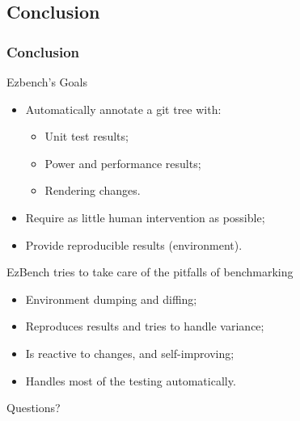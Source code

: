 \documentclass[11pt,english,compress]{beamer}
\begin{document}
\subsection*{Conclusion}
\begin{frame}
	\frametitle{Conclusion}
	
	\begin{block}{Ezbench's Goals}
		\begin{itemize}
			\item Automatically annotate a git tree with:
			\begin{itemize}
				\item Unit test results;
				\item Power and performance results;
				\item Rendering changes.
			\end{itemize}
			\item Require as little human intervention as possible;
			\item Provide reproducible results (environment).
		\end{itemize}
	\end{block}
	
	\pause
	
	\begin{block}{EzBench tries to take care of the pitfalls of benchmarking}
		\begin{itemize}
			\item Environment dumping and diffing;
			\item Reproduces results and tries to handle variance;
			\item Is reactive to changes, and self-improving;
			\item Handles most of the testing automatically.
		\end{itemize}
	\end{block}
\end{frame}

\begin{frame}[plain,c]
	\begin{center}
		\Huge Questions?
	\end{center}
\end{frame}
\end{document}
